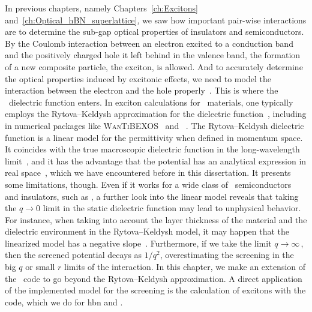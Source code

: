 In previous chapters, namely Chapters~\ref{ch:Excitons} and~\ref{ch:Optical_hBN_superlattice}, we saw how important pair-wise interactions are to determine the sub-gap optical properties of insulators and semiconductors.
By the Coulomb interaction between an electron excited to a conduction band and the positively charged hole it left behind in the valence band, the formation of a new composite particle, the exciton, is allowed.
And to accurately determine the optical properties induced by excitonic effects, we need to model the interaction between the electron and the hole properly~\cite{Latini_2015,Trolle_Pedersen_Veniard_2017}.
This is where the \rpa~dielectric function enters.
In exciton calculations for \bd~materials, one typically employs the Rytova--Keldysh approximation for the dielectric function~\cite{Gomes_Trallero-Giner_Vasilevskiy_2021,Mauricio_2022,Ridolfi_2015,Ventura_2019,Rytova_1967,PhysRevB.98.125308}, including in numerical packages like \textsc{WanTiBEXOS}~\cite{Dias_Silveira_Qu_2023} and \xatu~\cite{Xatu}.
The Rytova--Keldysh dielectric function is a linear model for the permittivity when defined in momentum space.
It coincides with the true macroscopic dielectric function in the long-wavelength limit~\cite{Trolle_Pedersen_Veniard_2017,Latini_2015}, and it has the advantage that the potential has an analytical expression in real space~\cite{Rytova_1967,Ventura_2019,Mauricio_2022,Gomes_Trallero-Giner_Vasilevskiy_2021,}, which we have encountered before in this dissertation.
It presents some limitations, though.
Even if it works for a wide class of \bd~semiconductors and insulators, such as \hbn, a further look into the linear model reveals that taking the $q \to 0$ limit in the static dielectric function may lead to unphysical behavior.
For instance, when taking into account the layer thickness of the material and the dielectric environment in the Rytova--Keldysh model, it may happen that the linearized model has a negative slope~\cite{Trolle_Pedersen_Veniard_2017}.
Furthermore, if we take the limit $q \to \infty$\,, then the screened potential decays as $1/q^2$, overestimating the screening in the big $q$ or small $r$ limits of the interaction.
In this chapter, we make an extension of the \xatu~code to go beyond the Rytova--Keldysh approximation.
A direct application of the implemented model for the screening is the calculation of excitons with the code, which we do for \gls{hbn} and .

